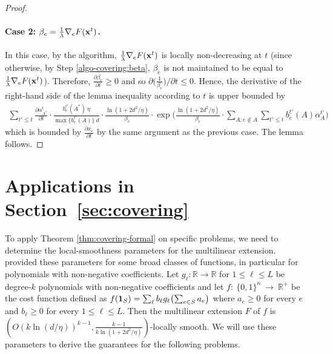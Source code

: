 \begin{proof}
\paragraph{Case 2: $\beta_{e} = \frac{1}{\lambda} \nabla_{e} F(\mathbf{x}^{t})$.}
In this case, by the algorithm, $\frac{1}{\lambda} \nabla_{e} F(\mathbf{x}^{t})$ is locally non-decreasing at $t$ (since otherwise,
by Step \ref{algo-covering:beta}, $\beta_{e}$ is not maintained to be equal to $\frac{1}{\lambda} \nabla_{e} F(\mathbf{x}^{t})$).
Therefore, $\frac{\partial \beta_{e}}{\partial t} \geq 0$ and so $\partial \bigl(\frac{1}{\beta_{e}}\bigr)/\partial t \leq 0$.
Hence, the derivative of the right-hand side of the lemma inequality according to $t$ is upper bounded by
\begin{align*}
\sum_{t' \le t} \frac{\partial \alpha^{t}_{A^{*}}}{\partial t} \cdot
	\frac{b^{t'}_{e}(A^{*}) \ \eta}{\max \{b^{t'}_{e}(A)\} \ d} \cdot \frac{\ln(1+2d^{2}/\eta)}{\beta_{e}}
		\cdot \exp\biggl( \frac{\ln(1+2d^{2}/\eta)}{\beta_{e} } \cdot \sum_{A: e \notin A} \sum_{t' \le t} b^{t'}_{e}(A) \alpha^{t'}_{A} \biggr)
\end{align*}
which is bounded by $\frac{\partial x_{e}}{\partial t}$ by the same argument as the previous case.
The lemma follows.
\end{proof}


\section{Applications in Section~\ref{sec:covering}}
To apply Theorem \ref{thm:covering-formal} on specific problems, we need to determine the local-smoothness parameters for the multilinear extension.
\cite{Thang20:Online-Primal-Dual} provided these parameters for some broad classes of functions, in particular for polynomials with non-negative coefficients. Let $g_{\ell}: \mathbb{R} \rightarrow \mathbb{R}$ for $1 \leq \ell \leq L$
be degree-$k$ polynomials with non-negative coefficients and let $f:~\{0,1\}^{n}~\rightarrow~\mathbb{R}^{+}$ be the cost function
defined as $f(\mathbf{1}_{S}) = \sum_{\ell} b_{\ell} g_{\ell}\bigl( \sum_{e \in S} a_{e} \bigr)$ where $a_{e} \geq 0$ for every
$e$ and $b_{\ell} \geq 0$ for every $1 \leq \ell \leq L$.
Then the multilinear extension $F$ of $f$ is $(O(k \ln(d/\eta))^{k-1}, \frac{k-1}{k \ln(1 + 2d^{2}/\eta)})$-locally smooth.
We will use these parameters to derive the guarantees for the following problems.




